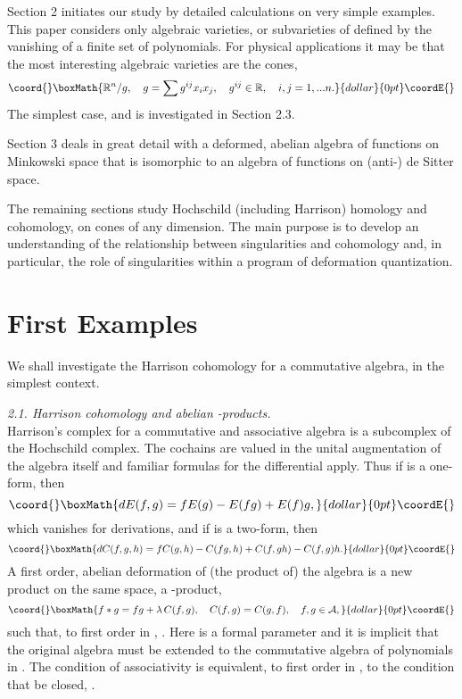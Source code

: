 \documentclass[a4paper,a4paper]{article}
\begin{document}
Section 2 initiates our study by detailed calculations on very simple
examples.  This paper considers only algebraic varieties, \coordHE{}or subvarieties of \coordHE{} defined by the vanishing of a finite set
of polynomials. For physical applications it may be that the most
interesting algebraic varieties are the cones,
$$\coord{}\boxMath{
\mathbb{R}^n/g,\quad g = \sum g^{ij}x_ix_j,\quad g^{ij} \in \mathbb{R},
\quad i,j =1,...n. 
}{dollar}{0pt}\coordE{}$$
The simplest case, \coordHE{} and \coordHE{} is investigated in
Section 2.3. 

Section 3 deals in great detail with a deformed, abelian algebra of
functions on Min\-kowski space that is isomorphic to an algebra of
functions on (anti-) de Sitter space.

The remaining sections study Hochschild (including Harrison) homology 
and cohomology,  on cones of any dimension. The main purpose is to develop an
understanding of the relationship between singularities and cohomology
and, in particular, the role of singularities within a program of
deformation quantization.


\section{First Examples}  %
 
  We shall investigate the Harrison  cohomology for a commutative
algebra, in the simplest context.

\smallskip

\noindent\textit{2.1. Harrison cohomology  and abelian \myHighlight{$*$}\coordHE{}-products.}\\
Harrison's complex  for a commutative and associative algebra 
\coordHE{} is a subcomplex of the Hochschild complex. The cochains are 
valued in the unital augmentation of the algebra itself and familiar formulas
for the differential apply. Thus if \coordHE{} is a one-form, then
$$\coord{}\boxMath{
dE(f,g) = fE(g) -E(fg) + E(f)g,
}{dollar}{0pt}\coordE{}$$
which vanishes for derivations, and if \coordHE{} is a two-form, then
$$\coord{}\boxMath{
dC(f,g,h) = fC(g,h) - C(fg,h) + C(f,gh) - C(f,g)h.
}{dollar}{0pt}\coordE{}$$
A first order, abelian deformation of  (the product of) the algebra  is a
new product on the same space, a \myHighlight{$*$}\coordHE{}-product,
$$\coord{}\boxMath{
f*g = fg + \lambda \,C(f,g),\quad C(f,g) = C(g,f),\quad f,g \in {\mathcal{A}},
}{dollar}{0pt}\coordE{}$$
such that, to first order in \myHighlight{$\lambda$}\coordHE{}, \coordHE{}. Here
\myHighlight{$\lambda$}\coordHE{} is a formal parameter and it is implicit that the original
algebra must be extended to the commutative algebra of polynomials in
\myHighlight{$\lambda$}\coordHE{}. 
 The condition of associativity  is equivalent, to first order in
\myHighlight{$\lambda$}\coordHE{}, to the condition that \coordHE{} be closed, \coordHE{}.
\end{document}
